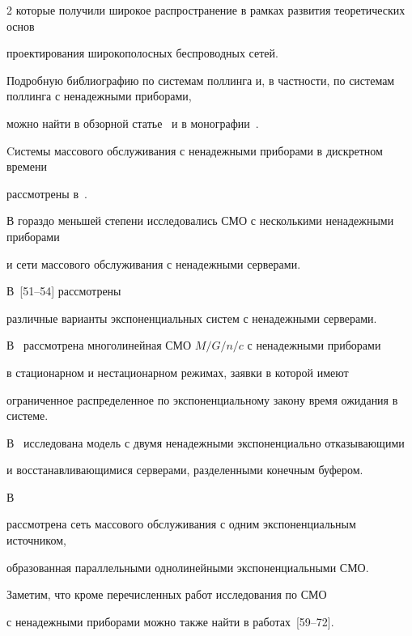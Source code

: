 \begin{multicols}{2}
которые получили широкое распространение в рамках развития теоретических основ


проектирования широкополосных беспроводных сетей.


Подробную библиографию по системам поллинга и, в част\-ности, по системам поллинга с ненадежными приборами,


можно найти в обзорной статье~\cite{Vishnevsky-Semenova_2006} и в монографии~\cite{Vishnevsky-Semenova_2007}.







Cистемы массового обслуживания с ненадежными приборами в дискретном времени


рас\-смот\-ре\-ны в~\cite{Dimitrov-Dokev_1981, Lee_1997, Moreno_2006, Atencia-Moreno_2006}.





В гораздо меньшей степени исследовались СМО с несколькими ненадежными приборами


и сети массового обслуживания с ненадежными серверами.


В~[51--54] рассмотрены


различные варианты экспоненциальных систем с ненадежными серверами.


В~\cite{Mikadze-Mikadze-Khocholava_2007} рассмотрена многолинейная СМО $M/G/n/c$ с ненадежными приборами


в стацио\-нарном и нестационарном режимах, заявки в которой имеют


ограниченное распределенное по экспоненциальному закону время ожидания в системе.


В~\cite{Chakravarthy_1987} исследована модель с двумя ненадежными экспоненциально отказывающими


и восстанавливающимися серверами, разделенными конечным буфером.


В~\cite{Tananko-Yudaeva_2007_1, Tananko-Yudaeva_2007_2}


рассмотрена сеть массового обслуживания с одним экспоненциальным источником,


образованная параллельными однолинейными экспоненциальными СМО.





Заметим, что кроме перечисленных работ исследования по СМО


с ненадежными приборами можно также найти в работах~[59--72].



\end{multicols}
